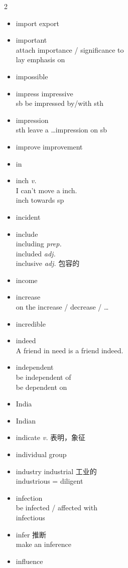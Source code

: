 \documentclass[../../book.tex]{subfiles}
\begin{document}
\begin{multicols}{2}
\begin{itemize}
\item[-] import \phantom{a} export
\item[-] important
\\attach importance / significance to
\\lay emphasis on
\item[-] impossible
\item[-] impress \phantom{a} impressive
\\sb be impressed by/with sth
\item[-] impression
\\sth leave a \ldots impression on sb
\item[-] improve \phantom{a} improvement
\item[-] in
\item[-] inch \emph{v.}
\\I can\textquoteright t move a inch. 
\\inch towards sp
\item[-] incident
\item[-] include
\\including \emph{prep.}
\\included \emph{adj.}
\\inclusive \emph{adj.} 包容的
\item[-] income
\item[-] increase
\\on the increase / decrease / \ldots
\item[-] incredible
\item[-] indeed
\\A friend in need is a friend indeed.
\item[-] independent
\\be independent of
\\be dependent on
\item[-] India
\item[-] Indian
\item[-] indicate \emph{v.} 表明，象征
\item[-] individual \phantom{a} group
\item[-] industry \phantom{a} industrial 工业的
\\{\color{violet}industrious = diligent}
\item[-] infection
\\be infected / affected with
\\infectious
\item[-] infer 推断
\\make an inference
\item[-] influence

\end{itemize}
\end{multicols}
\end{document}
